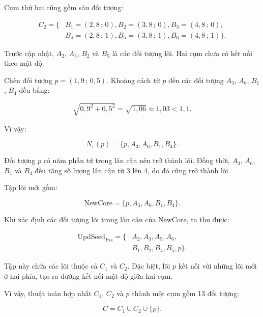Cụm thứ hai cũng gồm sáu đối tượng:

\begin{equation}
\begin{aligned}
C_2=\{&
B_1=(2{,}8\,;\,0),B_2=(3{,}8\,;\,0),B_3=(4{,}8\,;\,0),\\
&B_4=(2{,}8\,;\,1),B_5=(3{,}8\,;\,1),B_6=(4{,}8\,;\,1)\}.
\end{aligned}
\end{equation}

Trước cập nhật, \(A_2\), \(A_5\), \(B_2\) và \(B_5\) là các đối tượng lõi. Hai cụm chưa có kết nối theo mật độ.

Chèn đối tượng \(p=(1{,}9\,;\,0{,}5)\). Khoảng cách từ \(p\) đến các đối tượng \(A_3\), \(A_6\), \(B_1\), \(B_4\) đều bằng:

\begin{equation}
    \sqrt{0{,}9^2+0{,}5^2}
    =\sqrt{1{,}06}\approx1{,}03<1{,}1.
\end{equation}

Vì vậy:

\begin{equation}
N_{\varepsilon}(p)=\{p,A_3,A_6,B_1,B_4\}.
\end{equation}

Đối tượng \(p\) có năm phần tử trong lân cận nên trở thành lõi. Đồng thời, \(A_3\), \(A_6\), \(B_1\) và \(B_4\) đều tăng số lượng lân cận từ 3 lên 4, do đó cũng trở thành lõi.

Tập lõi mới gồm:

\begin{equation}
    \mathrm{NewCore}=\{p,A_3,A_6,B_1,B_4\}.
\end{equation}

Khi xác định các đối tượng lõi trong lân cận của \(\mathrm{NewCore}\), ta thu được:

\begin{equation}
\begin{aligned}
\mathrm{UpdSeed}_{Ins}=\{&
A_2,A_3,A_5,A_6,\\
&B_1,B_2,B_4,B_5,p\}.
\end{aligned}
\end{equation}

Tập này chứa các lõi thuộc cả \(C_1\) và \(C_2\). Đặc biệt, lõi \(p\) kết nối với những lõi mới ở hai phía, tạo ra đường kết nối mật độ giữa hai cụm.

Vì vậy, thuật toán hợp nhất \(C_1\), \(C_2\) và \(p\) thành một cụm gồm 13 đối tượng:

\begin{equation}
    C=C_1\cup C_2\cup\{p\}.
\end{equation}


